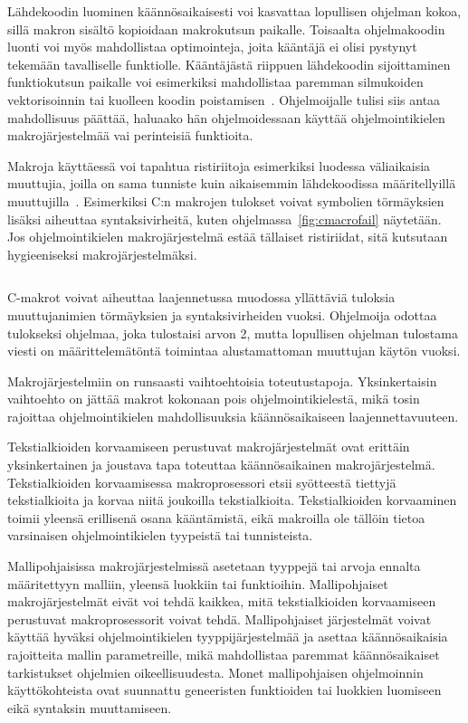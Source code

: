Lähdekoodin luominen käännösaikaisesti voi kasvattaa lopullisen ohjelman kokoa,
sillä makron sisältö kopioidaan makrokutsun paikalle. Toisaalta ohjelmakoodin
luonti voi myös mahdollistaa optimointeja, joita kääntäjä ei olisi pystynyt
tekemään tavalliselle funktiolle. Kääntäjästä riippuen lähdekoodin
sijoittaminen funktiokutsun paikalle voi esimerkiksi mahdollistaa paremman
silmukoiden vektorisoinnin tai kuolleen koodin poistamisen~\citep{cinlining}.
Ohjelmoijalle tulisi siis antaa mahdollisuus päättää, haluaako hän
ohjelmoidessaan käyttää ohjelmointikielen makrojärjestelmää vai perinteisiä
funktioita.

Makroja käyttäessä voi tapahtua ristiriitoja esimerkiksi luodessa väliaikaisia
muuttujia, joilla on sama tunniste kuin aikaisemmin lähdekoodissa
määritellyillä muuttujilla~\citep{macrohygiene}. Esimerkiksi C:n makrojen
tulokset voivat symbolien törmäyksien lisäksi aiheuttaa syntaksivirheitä, kuten
ohjelmassa~\ref{fig:cmacrofail} näytetään. Jos ohjelmointikielen
makrojärjestelmä estää tällaiset ristiriidat, sitä kutsutaan hygieeniseksi
makrojärjestelmäksi.

\begin{listing}[ht!]
    \inputminted{C}{koodi/cmacrofail.c}
    \caption{C-makrot voivat aiheuttaa laajennetussa muodossa yllättäviä
    tuloksia muuttujanimien törmäyksien ja syntaksivirheiden vuoksi. Ohjelmoija
    odottaa tulokseksi ohjelmaa, joka tulostaisi arvon 2, mutta lopullisen
    ohjelman tulostama viesti on määrittelemätöntä toimintaa alustamattoman
    muuttujan käytön vuoksi.}
    \label{fig:cmacrofail}
\end{listing}

Makrojärjestelmiin on runsaasti vaihtoehtoisia toteutustapoja. Yksinkertaisin
vaihtoehto on jättää makrot kokonaan pois ohjelmointikielestä, mikä tosin
rajoittaa ohjelmointikielen mahdollisuuksia käännösaikaiseen
laajennettavuuteen.

Tekstialkioiden korvaamiseen perustuvat makrojärjestelmät ovat erittäin
yksinkertainen ja joustava tapa toteuttaa käännösaikainen makrojärjestelmä.
Tekstialkioiden korvaamisessa makroprosessori etsii syötteestä tiettyjä
tekstialkioita ja korvaa niitä joukoilla tekstialkioita. Tekstialkioiden
korvaaminen toimii yleensä erillisenä osana kääntämistä, eikä makroilla ole
tällöin tietoa varsinaisen ohjelmointikielen tyypeistä tai tunnisteista.

Mallipohjaisissa makrojärjestelmissä asetetaan tyyppejä tai arvoja ennalta
määritettyyn malliin, yleensä luokkiin tai funktioihin. Mallipohjaiset
makrojärjestelmät eivät voi tehdä kaikkea, mitä tekstialkioiden korvaamiseen
perustuvat makroprosessorit voivat tehdä. Mallipohjaiset järjestelmät voivat
käyttää hyväksi ohjelmointikielen tyyppijärjestelmää ja asettaa käännösaikaisia
rajoitteita mallin parametreille, mikä mahdollistaa paremmat käännösaikaiset
tarkistukset ohjelmien oikeellisuudesta. Monet mallipohjaisen ohjelmoinnin
käyttökohteista ovat suunnattu geneeristen funktioiden tai luokkien luomiseen
eikä syntaksin muuttamiseen.

